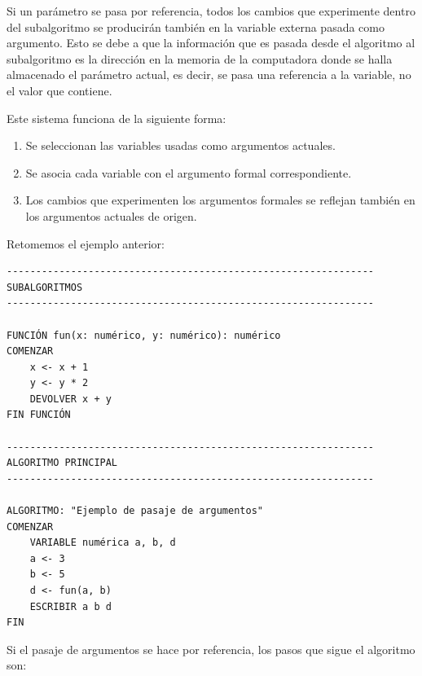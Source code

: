 \documentclass[
]{book}
\providecommand{\tightlist}{%
  \setlength{\itemsep}{0pt}\setlength{\parskip}{0pt}}
\begin{document}
Si un parámetro se pasa por referencia, todos los cambios que experimente dentro del subalgoritmo se producirán también en la variable externa pasada como argumento. Esto se debe a que la información que es pasada desde el algoritmo al subalgoritmo es la dirección en la memoria de la computadora donde se halla almacenado el parámetro actual, es decir, se pasa una referencia a la variable, no el valor que contiene.

Este sistema funciona de la siguiente forma:

\begin{enumerate}
\def\labelenumi{\arabic{enumi}.}
\tightlist
\item
  Se seleccionan las variables usadas como argumentos actuales.
\item
  Se asocia cada variable con el argumento formal correspondiente.
\item
  Los cambios que experimenten los argumentos formales se reflejan también en los argumentos actuales de origen.
\end{enumerate}

Retomemos el ejemplo anterior:

\begin{verbatim}
---------------------------------------------------------------
SUBALGORITMOS
---------------------------------------------------------------

FUNCIÓN fun(x: numérico, y: numérico): numérico
COMENZAR
    x <- x + 1
    y <- y * 2
    DEVOLVER x + y
FIN FUNCIÓN

---------------------------------------------------------------
ALGORITMO PRINCIPAL
---------------------------------------------------------------

ALGORITMO: "Ejemplo de pasaje de argumentos"
COMENZAR
    VARIABLE numérica a, b, d
    a <- 3
    b <- 5
    d <- fun(a, b)
    ESCRIBIR a b d
FIN
\end{verbatim}

Si el pasaje de argumentos se hace por referencia, los pasos que sigue el algoritmo son:
\end{document}
